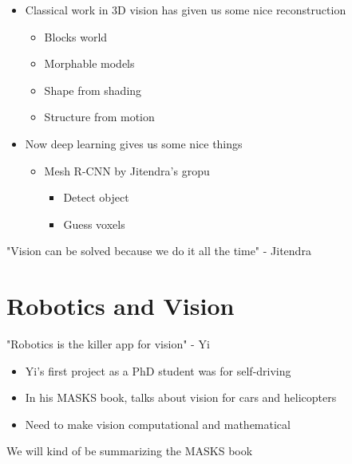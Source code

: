\documentclass{report}
\begin{document}
    \begin{itemize}
        \item Classical work in 3D vision has given us some nice reconstruction
        \begin{itemize}
            \item Blocks world
            \item Morphable models
            \item Shape from shading
            \item Structure from motion
        \end{itemize}
        \item Now deep learning gives us some nice things
        \begin{itemize}
            \item Mesh R-CNN by Jitendra's gropu
            \begin{itemize}
                \item Detect object
                \item Guess voxels
            \end{itemize}
        \end{itemize}
    \end{itemize}

    "Vision can be solved because we do it all the time" - Jitendra

    \section{Robotics and Vision}

    "Robotics is the killer app for vision" - Yi

    \begin{itemize}
        \item Yi's first project as a PhD student was for self-driving
        \item In his MASKS book, talks about vision for cars and helicopters
        \item Need to make vision computational and mathematical
    \end{itemize}

    We will kind of be summarizing the MASKS book
\end{document}
